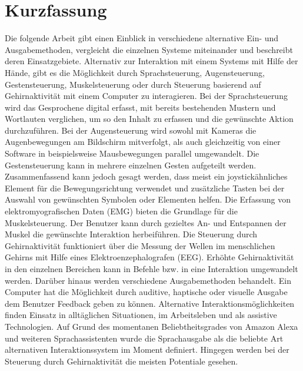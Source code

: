 \chapter{Kurzfassung}

Die folgende Arbeit gibt einen Einblick in verschiedene alternative Ein- und Ausgabemethoden, vergleicht die einzelnen Systeme miteinander und beschreibt deren Einsatzgebiete.
\newline \newline
Alternativ zur Interaktion mit einem Systems mit Hilfe der Hände, gibt es die Möglichkeit durch Sprachsteuerung, Augensteuerung, Gestensteuerung, Muskelsteuerung oder durch Steuerung basierend auf Gehirnaktivität mit einem Computer zu interagieren. Bei der Sprachsteuerung wird das Gesprochene digital erfasst, mit bereits bestehenden Mustern und Wortlauten verglichen, um so den Inhalt zu erfassen und die gewünschte Aktion durchzuführen. Bei der Augensteuerung wird sowohl mit Kameras die Augenbewegungen am Bildschirm mitverfolgt, als auch gleichzeitig von einer Software in beispielsweise Mausbewegungen parallel umgewandelt. Die Gestensteuerung kann in mehrere einzelnen Gesten aufgeteilt werden. Zusammenfassend kann jedoch gesagt werden, dass meist ein joystickähnliches Element für die Bewegungsrichtung verwendet und zusätzliche Tasten bei der Auswahl von gewünschten Symbolen oder Elementen helfen. Die Erfassung von elektromyografischen Daten (EMG) bieten die Grundlage für die Muskelsteuerung. Der Benutzer kann durch gezieltes An- und Entspannen der Muskel die gewünschte Interaktion herbeiführen. Die Steuerung durch Gehirnaktivität funktioniert über die Messung der Wellen im menschlichen Gehirns mit Hilfe eines  Elektroenzephalografen (EEG). Erhöhte Gehirnaktivität in den einzelnen Bereichen kann in Befehle bzw. in eine Interaktion umgewandelt werden.
\newline \newline
Darüber hinaus werden verschiedene Ausgabemethoden behandelt. Ein Computer hat die Möglichkeit durch auditive, haptische oder visuelle Ausgabe dem Benutzer Feedback geben zu können.
\newline \newline
Alternative Interaktionsmöglichkeiten finden Einsatz in alltäglichen Situationen, im Arbeitsleben und als assistive Technologien. Auf Grund des momentanen Beliebtheitsgrades von Amazon Alexa und weiteren Sprachassistenten wurde die Sprachausgabe als die beliebte Art alternativen Interaktionssystem im Moment definiert. Hingegen werden bei der Steuerung durch Gehirnaktivität die meisten Potentiale gesehen.
